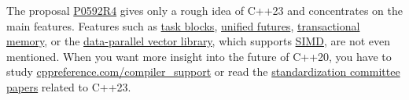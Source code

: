 The proposal \href{http://www.open-std.org/jtc1/sc22/wg21/docs/papers/2019/p0592r4.html}{P0592R4} gives only a rough idea of C++23 and concentrates on the main features. Features such as \href{ttps://www.modernescpp.com/index.php/task-blocks}{task blocks}, \href{https://www.modernescpp.com/index.php/the-end-of-the-detour-unified-futures}{unified futures}, \href{https://www.modernescpp.com/index.php/transactional-memory}{transactional memory}, or the \href{https://en.cppreference.com/w/cpp/experimental/simd}{data-parallel vector library}, which supports \href{https://en.wikipedia.org/wiki/SIMD}{SIMD}, are not even mentioned. When you want more insight into the future of C++20, you have to study \href{https://en.cppreference.com/w/cpp/compiler_support}{cppreference.com/compiler\_support} or read the \href{http://www.open-std.org/jtc1/sc22/wg21/docs/papers/}{standardization committee papers} related to C++23.
















